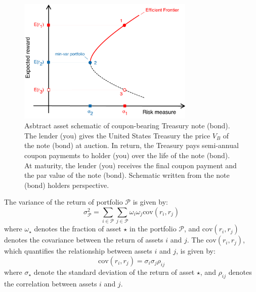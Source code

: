 \documentclass[11pt]{article}
\theoremstyle{definition}
\begin{document}
\begin{figure}[h]
    \centering
    \includegraphics[width=0.75\textwidth]{./figs/Fig-MinVar-Risky-Allocation.pdf}
    \caption{Asbtract asset schematic of coupon-bearing Treasury note (bond). The lender (you) gives the United States Treasury 
    the price $V_{B}$ of the note (bond) at auction. In return, the Treasury pays semi-annual coupon paymemts to holder (you) 
    over the life of the note (bond). At maturity, the lender (you) receives the final coupon payment
    and the par value of the note (bond). Schematic written from the note (bond) holders perspective.}\label{fig:risky-assets-schematic-minvar}
\end{figure}
The variance of the return of portfolio $\mathcal{P}$ is given by:
\begin{equation*}
\sigma_{\mathcal{P}}^2 = 
\sum_{i\in\mathcal{P}}\sum_{j\in\mathcal{P}}\omega_{i}\omega_{j}
\text{cov}\left(r_{i},r_{j}\right)
\end{equation*}
where $\omega_{\star}$ denotes the fraction of asset $\star$ in the portfolio $\mathcal{P}$, and 
$\text{cov}\left(r_{i},r_{j}\right)$ denotes the covariance between the return of assets $i$ and $j$.
The $\text{cov}\left(r_{i},r_{j}\right)$, which quantifies the relationship between assets $i$ and $j$, 
is given by:
\begin{equation*}
\text{cov}\left(r_{i},r_{j}\right) = \sigma_{i}\sigma_{j}\rho_{ij}
\end{equation*}
where $\sigma_{\star}$ denote the standard deviation of the return of asset $\star$, 
and $\rho_{ij}$ denotes the correlation between assets $i$ and $j$.
\end{document}
